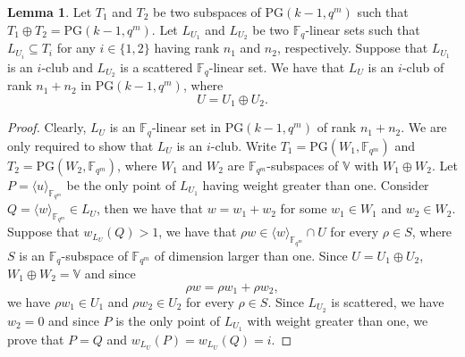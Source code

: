 \documentclass[11pt]{amsart}
\theoremstyle{definition}
\newtheorem{lemma}[theorem]{Lemma}
\newcommand{\F}{{\mathbb F}}
\newcommand{\fq}{{\mathbb F}_{q}}
\newcommand{\fqm}{\mathbb{F}_{q^m}}
\begin{document}
\begin{lemma}\label{le:iclubandscatered}
    Let $T_1$ and $T_2$ be two subspaces of $\mathrm{PG}(k-1,q^m)$ such that $T_1\oplus T_2=\mathrm{PG}(k-1,q^m)$.
    Let $L_{U_1}$ and $L_{U_2}$ be two $\fq$-linear sets such that $L_{U_i}\subseteq T_i$ for any $i \in \{1,2\}$ having rank $n_1$ and $n_2$, respectively. Suppose that $L_{U_1}$ is an $i$-club and $L_{U_2}$ is a scattered $\fq$-linear set. We have that $L_U$ is an $i$-club of rank $n_1+n_2$ in $\mathrm{PG}(k-1,q^m)$, where
    $$U=U_1\oplus U_2.$$
\end{lemma}
\begin{proof}
     Clearly, $L_U$ is an $\fq$-linear set in $\mathrm{PG}(k-1,q^m)$ of rank $n_1+n_2$. We are only required to show that $L_U$ is an $i$-club. %
    Write $T_1=\mathrm{PG}(W_1,\fqm)$ and $T_2=\mathrm{PG}(W_2,\fqm)$, where $W_1$ and $W_2$ are $\fqm$-subspaces of $\mathbb{V}$ with $W_1\oplus W_2$. Let $P=\langle u \rangle_{\fqm}$ be the only point of $L_{U_1}$ having weight greater than one. 
    Consider $Q=\langle w \rangle_{\F_{q^m}} \in L_{U}$, then we have that $w=w_1 + w_2$ for some $w_1 \in W_1$ and $w_2 \in W_2$. Suppose that $w_{L_{U}}(Q)>1$, we have that $\rho w \in \langle w \rangle_{\F_{q^m}}\cap U$ for every $\rho \in S$, where $S$ is an $\fq$-subspace of $\fqm$ of dimension larger than one.
    Since $U=U_1\oplus U_2$, $W_1\oplus W_2 =\mathbb{V}$ and since
\[\rho w=\rho w_1+\rho w_2,\] we have $\rho w_1 \in U_1$ and $\rho w_2 \in U_2$ for every $\rho \in S$. Since $L_{U_2}$ is scattered, we have $w_2=0$ and since $P$ is the only point of $L_{U_1}$ with weight greater than one, we prove that $P=Q$ and $w_{L_U}(P)=w_{L_U}(Q)=i$.
\end{proof}
\end{document}
